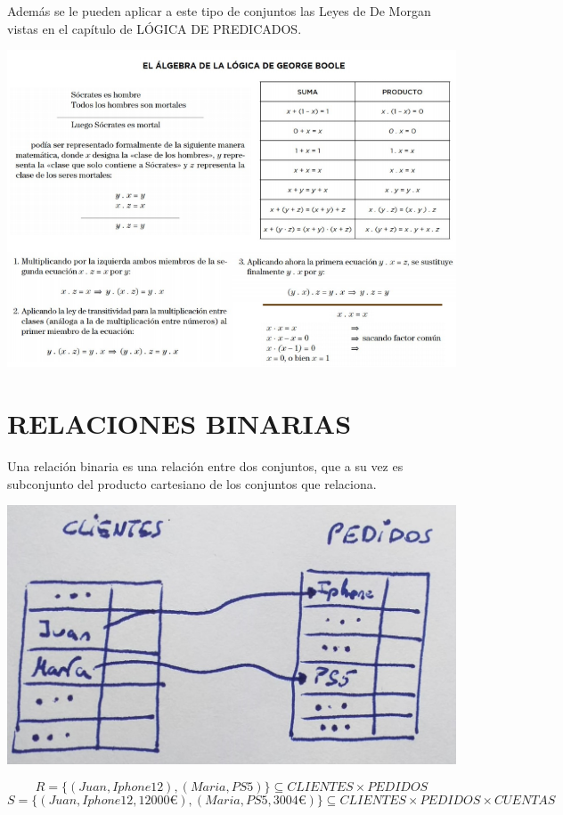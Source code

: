 \documentclass[10pt,a4paper,openright]{book}
\begin{document}
Además se le pueden aplicar a este tipo de conjuntos las Leyes de De Morgan vistas en el capítulo de LÓGICA DE PREDICADOS.

\begin{center}
\includegraphics[scale=0.75]{boole articulo}
\end{center}

\section*{RELACIONES BINARIAS}
Una relación binaria es una relación entre dos conjuntos, que a su vez es subconjunto del producto cartesiano de los conjuntos que relaciona.

\begin{center}
\includegraphics[scale=0.25]{ejemplo relaciones}
\end{center}

$$R=\{(Juan, Iphone 12), (Maria, PS5)\}\subseteq CLIENTES\times PEDIDOS$$
$$S=\{(Juan, Iphone 12,12000€), (Maria, PS5, 3004€)\}\subseteq CLIENTES\times PEDIDOS\times CUENTAS$$
\end{document}
